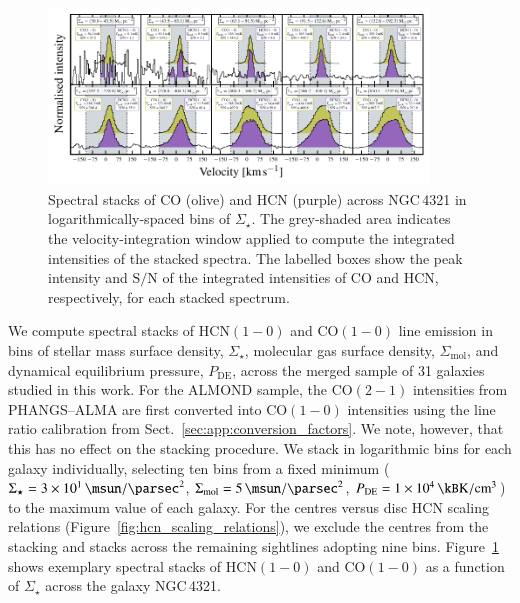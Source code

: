 \documentclass[letter, longauth]{aa} %
\newcommand*{\hcnone}{\ensuremath{\mathrm{HCN(1-0)}}\xspace} %
\newcommand*{\coone}{\ensuremath{\mathrm{CO(1-0)}}\xspace} %
\newcommand*{\cotwo}{\ensuremath{\mathrm{CO(2-1)}}\xspace} %
\newcommand*{\sigmol}{\ensuremath{\Sigma_{\text{mol}}}\xspace}  %
\newcommand*{\pde}{\ensuremath{P_{\text{DE}}}\xspace}  %
\newcommand*{\sigstar}{\ensuremath{\Sigma_{\star}}\xspace}  %
\newcommand*{\snr}{\ensuremath{\mathrm{S}/\mathrm{N}}\xspace}  %
\begin{document}
\begin{appendix}
\begin{figure}
\centering
\includegraphics[width=0.9\textwidth]{Figures/ngc4321_almond_stacked_spectra_via_INT_VAL_SD_STAR_compressed.pdf}
\caption{Spectral stacks of CO (olive) and HCN (purple) across NGC\,4321 in logarithmically-spaced bins of \sigstar. The grey-shaded area indicates the velocity-integration window applied to compute the integrated intensities of the stacked spectra. The labelled boxes show the peak intensity and \snr of the integrated intensities of CO and HCN, respectively, for each stacked spectrum.}
\label{fig:ngc4321_stacks}
\end{figure}

We compute spectral stacks of \hcnone and \coone line emission in bins of stellar mass surface density, \sigstar, molecular gas surface density, \sigmol, and dynamical equilibrium pressure, \pde, across the merged sample of 31 galaxies studied in this work.
For the ALMOND sample, the \cotwo intensities from PHANGS--ALMA are first converted into \coone intensities using the line ratio calibration from Sect.~\ref{sec:app:conversion_factors}. 
We note, however, that this has no effect on the stacking procedure. 
We stack in logarithmic bins for each galaxy individually, selecting ten bins from a fixed minimum ($\sigstar=\SI{3e1}{\msun\per\square\parsec}$, $\sigmol=\SI{5e0}{\msun\per\square\parsec}$, $\pde=\SI{1e4}{\kB\kelvin\per\cubic\cm}$) to the maximum value of each galaxy.
For the centres versus disc HCN scaling relations (Figure~\ref{fig:hcn_scaling_relations}), we exclude the centres from the stacking and stacks across the remaining sightlines adopting nine bins.
Figure~\ref{fig:ngc4321_stacks} shows exemplary spectral stacks of \hcnone and \coone as a function of \sigstar across the galaxy NGC\,4321.


\end{appendix}
\end{document}
